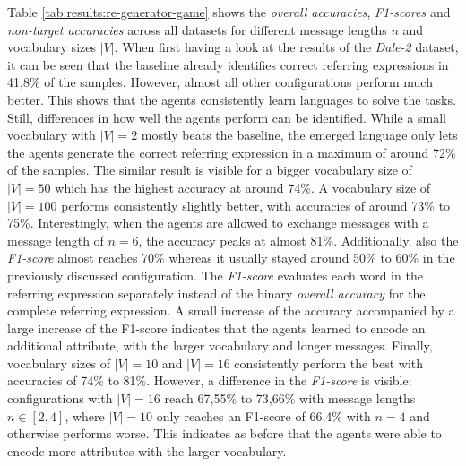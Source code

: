 Table \ref{tab:results:re-generator-game} shows the \emph{overall accuracies}, \emph{F1-scores} and \emph{non-target accuracies} across all datasets for different message lengths $n$ and vocabulary sizes $|V|$.
When first having a look at the results of the \emph{Dale-2} dataset, it can be seen that the baseline already identifies correct referring expressions in 41,8\% of the samples.
However, almost all other configurations perform much better.
This shows that the agents consistently learn languages to solve the tasks.
Still, differences in how well the agents perform can be identified.
While a small vocabulary with $|V| = 2$ mostly beats the baseline, the emerged language only lets the agents generate the correct referring expression in a maximum of around 72\% of the samples.
The similar result is visible for a bigger vocabulary size of $|V|=50$ which has the highest accuracy at around 74\%.
A vocabulary size of $|V|=100$ performs consistently slightly better, with accuracies of around 73\% to 75\%.
Interestingly, when the agents are allowed to exchange messages with a message length of $n=6$, the accuracy peaks at almost 81\%.
Additionally, also the \emph{F1-score} almost reaches 70\% whereas it usually stayed around 50\% to 60\% in the previously discussed configuration.
The \emph{F1-score} evaluates each word in the referring expression separately instead of the binary \emph{overall accuracy} for the complete referring expression.
A small increase of the accuracy accompanied by a large increase of the F1-score indicates that the agents learned to encode an additional attribute, with the larger vocabulary and longer messages.
Finally, vocabulary sizes of $|V|=10$ and $|V|=16$ consistently perform the best with accuracies of 74\% to 81\%.
However, a difference in the \emph{F1-score} is visible: configurations with $|V|=16$ reach 67,55\% to 73,66\% with message lengths $n \in [2,4]$, where $|V|=10$ only reaches an F1-score of 66,4\% with $n=4$ and otherwise performs worse.
This indicates as before that the agents were able to encode more attributes with the larger vocabulary.

